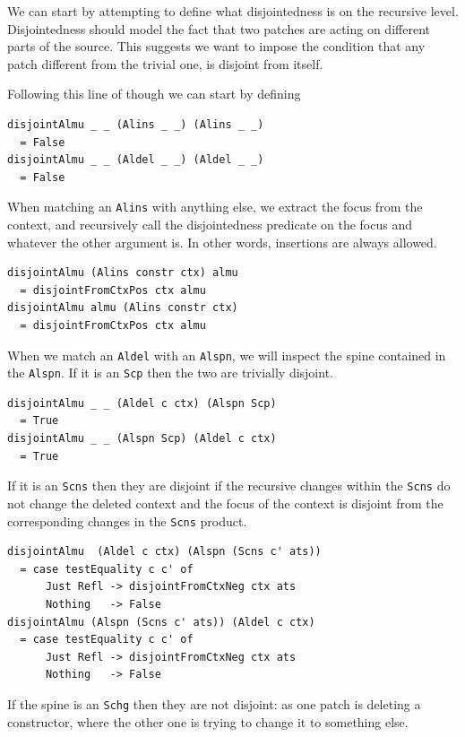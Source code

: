 \documentclass[11pt, titlepage]{article}
\newcommand{\toHaskell}[1]{\texttt{#1}\xspace}
\newcommand{\alins}{\toHaskell{Alins}}
\newcommand{\aldel}{\toHaskell{Aldel}}
\newcommand{\alspn}{\toHaskell{Alspn}}
\newcommand{\scp}{\toHaskell{Scp}}
\newcommand{\scns}{\toHaskell{Scns}}
\newcommand{\schg}{\toHaskell{Schg}}
\begin{document}
We can start by attempting to define what disjointedness is on the recursive level.  Disjointedness should model the fact that two patches are acting on different parts of the source. This suggests we want to impose the condition that any patch different from the trivial one, is disjoint from itself.  

Following this line of though we can start by defining

\begin{verbatim}
disjointAlmu _ _ (Alins _ _) (Alins _ _) 
  = False
disjointAlmu _ _ (Aldel _ _) (Aldel _ _)
  = False
\end{verbatim}

When matching an \alins with anything else, we extract the focus from the context, and recursively call the disjointedness predicate on the focus and whatever the other argument is. In other words, insertions are always allowed.

\begin{verbatim}
disjointAlmu (Alins constr ctx) almu
  = disjointFromCtxPos ctx almu
disjointAlmu almu (Alins constr ctx)
  = disjointFromCtxPos ctx almu
\end{verbatim}

When we match an \aldel with an \alspn, we will inspect the spine contained in the \alspn.
If it is an \scp then the two are trivially disjoint.

\begin{verbatim}
disjointAlmu _ _ (Aldel c ctx) (Alspn Scp)
  = True
disjointAlmu _ _ (Alspn Scp) (Aldel c ctx)
  = True
\end{verbatim}

If it is an \scns then they are disjoint if the recursive changes within the \scns do not change the deleted context and the focus of the context is disjoint from the corresponding changes in the \scns product.

\begin{verbatim}
disjointAlmu  (Aldel c ctx) (Alspn (Scns c' ats))
  = case testEquality c c' of
      Just Refl -> disjointFromCtxNeg ctx ats
      Nothing   -> False
disjointAlmu (Alspn (Scns c' ats)) (Aldel c ctx)
  = case testEquality c c' of
      Just Refl -> disjointFromCtxNeg ctx ats
      Nothing   -> False
\end{verbatim}

If the spine is an \schg then they are not disjoint: as one patch is deleting a constructor, where the other one is trying to change it to something else.
\end{document}
